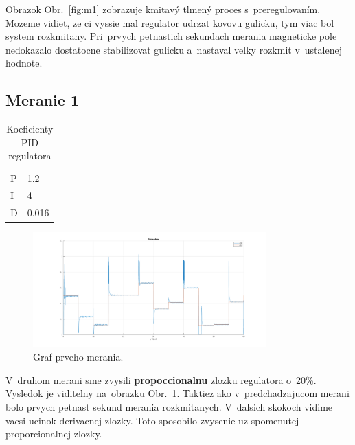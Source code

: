 \documentclass{article}
\begin{document}
Obrazok Obr.~\ref{fig:m1} zobrazuje kmitavý tlmený proces s~preregulovaním. Mozeme vidiet, ze ci vyssie mal
regulator udrzat kovovu gulicku, tym viac bol system rozkmitany. Pri~prvych petnastich sekundach merania
magneticke pole nedokazalo dostatocne stabilizovat gulicku a~nastaval velky rozkmit v~ustalenej hodnote.

\clearpage

\subsection{Meranie 1}
\label{sec:meranie1}

\begin{table}[!htbp]
	\caption{Koeficienty PID regulatora}
	\label{tab:t1}
	\begin{center}
		\begin{tabular}[c]{|l|l|}
			\hline
			P & 1.2 \\
			I & 4 \\
			D & 0.016 \\
			\hline
		\end{tabular}
	\end{center}
\end{table}

\begin{figure}[!htbp]
	\begin{center}
		\includegraphics[width=0.8\textwidth]{./include/m2.png}
	\end{center}
	\caption{Graf prveho merania.}
	\label{fig:meranie1}
\end{figure}

V~druhom merani sme zvysili \textbf{propoccionalnu} zlozku regulatora o~20\%. Vysledok je viditelny
na~obrazku Obr.~\ref{fig:meranie1}. Taktiez ako v~predchadzajucom merani bolo prvych petnast sekund
merania rozkmitanych. V~dalsich skokoch vidime vacsi ucinok derivacnej zlozky. Toto sposobilo zvysenie
uz spomenutej proporcionalnej zlozky.

\clearpage
\end{document}
